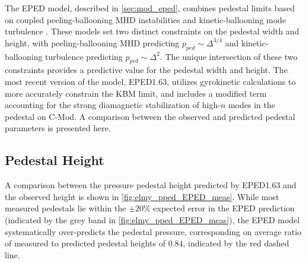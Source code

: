 The EPED model, described in \cref{sec:mod_eped}, combines pedestal limits based on coupled peeling-ballooning MHD instabilities \cite{Snyder2004,Wilson2002,Wilson2006} and kinetic-ballooning mode turbulence \cite{Snyder2001}.  These models set two distinct constraints on the pedestal width and height, with peeling-ballooning MHD predicting $p_{ped} \sim \Delta^{3/4}$ and kinetic-ballooning turbulence predicting $p_{ped} \sim \Delta^2$.  The unique intersection of these two constraints provides a predictive value for the pedestal width and height.  The most recent version of the model, EPED1.63, utilizes gyrokinetic calculations to more accurately constrain the KBM limit, and includes a modified term accounting for the strong diamagnetic stabilization of high-$n$ modes in the pedestal on C-Mod.  A comparison between the observed and predicted pedestal parameters is presented here.

\subsection{Pedestal Height}\label{subsec:elmy_eped_height}

A comparison between the pressure pedestal height predicted by EPED1.63 and the observed height is shown in \cref{fig:elmy_pped_EPED_meas}.  While most measured pedestals lie within the $\pm 20\%$ expected error in the EPED prediction (indicated by the grey band in \cref{fig:elmy_pped_EPED_meas}), the EPED model systematically over-predicts the pedestal pressure, corresponding on average ratio of measured to predicted pedestal heights of $0.84$, indicated by the red dashed line.

\begin{figure}[ht]
 \pushtooutside
\end{figure}

